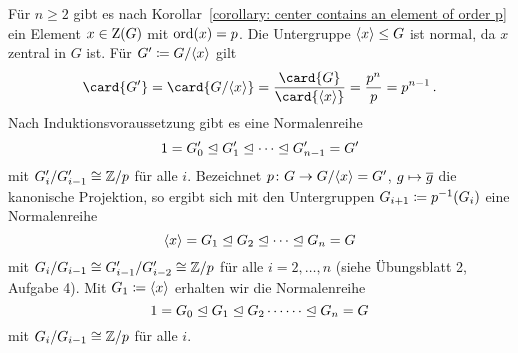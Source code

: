 Für $n \geq 2$ gibt es nach Korollar~\ref{corollary: center contains an element of order p} ein Element $x \in \operatorname{Z}(G)$ mit $\operatorname{ord}(x) = p$.
Die Untergruppe $\langle x\rangle \leq G$ ist normal, da $x$ zentral in $G$ ist.
Für $G' \coloneqq G/\langle x\rangle$ gilt
\[
    \card{G'}
  = \card{G/\generated{x}}
  = \frac{\card{G}}{\card{\generated{x}}}
  = \frac{p^n}{p}
  = p^{n-1}\,.
\]
Nach Induktionsvoraussetzung gibt es eine Normalenreihe
\[
              1
  =           G'_0
  \trianglelefteq  G'_1
  \trianglelefteq  \dotsb
  \trianglelefteq  G'_{n-1}
  =           G'
\]
mit $G'_i/G'_{i-1} \cong \mathbb{Z}/p$ für alle $i$.
Bezeichnet $p \colon G \to G/\langle x\rangle = G'$, $g \mapsto \overline{g}$ die kanonische Projektion, so ergibt sich mit den Untergruppen $G_{i+1} \coloneqq p^{-1}(G_i)$ eine Normalenreihe
\[
              \langle x\rangle
  =           G_1
  \trianglelefteq  G_2
  \trianglelefteq  \dotsb
  \trianglelefteq  G_n
  =           G
\]
mit $G_i/G_{i-1} \cong G'_{i-1}/G'_{i-2} \cong \mathbb{Z}/p$ für alle $i = 2, \dotsc, n$ (siehe Übungsblatt 2, Aufgabe 4).
Mit $G_1 \coloneqq \langle x\rangle$ erhalten wir die Normalenreihe
\[
              1
  =           G_0
  \trianglelefteq  G_1
  \trianglelefteq  G_2
  \dotsb      \dotsb
  \trianglelefteq  G_n
  =           G
\]
mit $G_i/G_{i-1} \cong \mathbb{Z}/p$ für alle $i$.

